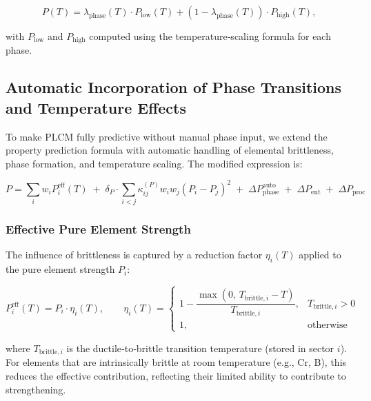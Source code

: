 \documentclass[12pt,a4paper]{article}
\begin{document}
	\begin{equation}
		P(T) = \lambda_{\text{phase}}(T) \cdot P_{\text{low}}(T) + (1-\lambda_{\text{phase}}(T)) \cdot P_{\text{high}}(T),
		\label{eq:phase-transition}
	\end{equation}
	
	with \(P_{\text{low}}\) and \(P_{\text{high}}\) computed using the temperature‑scaling formula for each phase.
	
	\subsection{Automatic Incorporation of Phase Transitions and Temperature Effects}
	\label{subsec:auto-phase}
	
	To make PLCM fully predictive without manual phase input, we extend the property prediction formula with automatic handling of elemental brittleness, phase formation, and temperature scaling. The modified expression is:
	
	\begin{equation}
		\boxed{
			P = \sum_i w_i P_i^{\text{eff}}(T) \;+\; \delta_P \cdot \sum_{i<j} \kappa_{ij}^{(P)} w_i w_j (P_i - P_j)^2 \;+\; \Delta P_{\text{phase}}^{\text{auto}} \;+\; \Delta P_{\text{ent}} \;+\; \Delta P_{\text{proc}}
		}
		\label{eq:plcm-auto}
	\end{equation}
	
	\subsubsection{Effective Pure Element Strength}
	The influence of brittleness is captured by a reduction factor $\eta_i(T)$ applied to the pure element strength $P_i$:
	
	\begin{equation}
		P_i^{\text{eff}}(T) = P_i \cdot \eta_i(T), \qquad
		\eta_i(T) = 
		\begin{cases}
			1 - \dfrac{\max(0,\, T_{\text{brittle},i} - T)}{T_{\text{brittle},i}}, & T_{\text{brittle},i} > 0 \\
			1, & \text{otherwise}
		\end{cases}
	\end{equation}
	
	where $T_{\text{brittle},i}$ is the ductile‑to‑brittle transition temperature (stored in sector $i$). For elements that are intrinsically brittle at room temperature (e.g., Cr, B), this reduces the effective contribution, reflecting their limited ability to contribute to strengthening.
	
\end{document}
